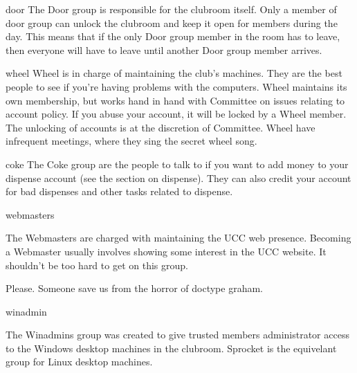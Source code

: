 \begin{uccgroup}{door}
The Door group is responsible for the clubroom itself. Only a member of door group can unlock the clubroom and keep it open for members during the day. This means that if the only Door group member in the room has to leave, then everyone will have to leave until another Door group member arrives.
\end{uccgroup}

\begin{uccgroup}{wheel}
Wheel is in charge of maintaining the club's machines. They are the best people to see if you're having problems with the computers. Wheel maintains its own membership, but works hand in hand with Committee on issues relating to account policy. If you abuse your account, it will be locked by a Wheel member. The unlocking of accounts is at the discretion of Committee. Wheel have infrequent meetings, where they sing the secret wheel song. %
\end{uccgroup}

\begin{uccgroup}{coke}
The Coke group are the people to talk to if you want to add money to your dispense account (see the section on dispense). They can also credit your account for bad dispenses and other tasks related to dispense.
\end{uccgroup}

\begin{uccgroup}{webmasters}

The Webmasters are charged with maintaining the UCC web presence. Becoming a Webmaster usually involves showing some interest in the UCC website. It shouldn't be too hard to get on this group.

 Please. Someone save us from the horror of doctype graham.
\end{uccgroup}

\begin{uccgroup}{winadmin}

The Winadmins group was created to give trusted members administrator access to the Windows desktop machines in the clubroom. Sprocket is the equivelant group for Linux desktop machines.
\end{uccgroup}






